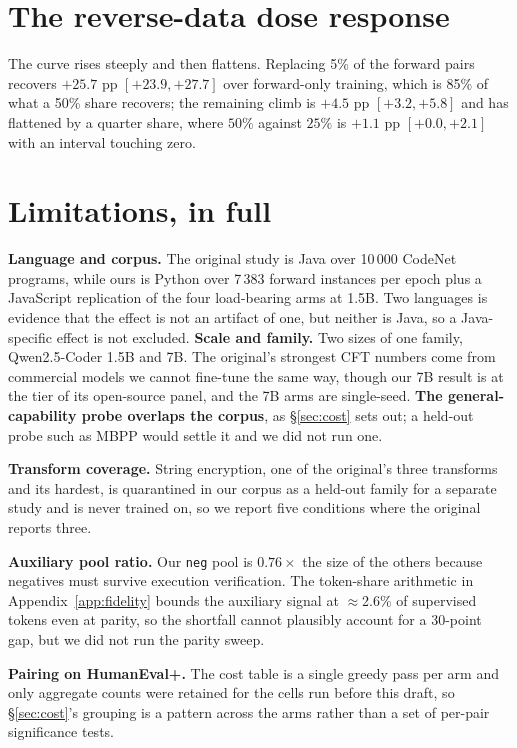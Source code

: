 \documentclass{article}
\newcommand{\arm}[1]{\texttt{#1}}
\begin{document}
\section{The reverse-data dose response}
\label{app:dose}

The curve rises steeply and then flattens. Replacing 5\% of the forward pairs recovers
$+25.7$ pp $[+23.9,+27.7]$ over forward-only training, which is 85\% of what a 50\% share
recovers; the remaining climb is $+4.5$ pp $[+3.2,+5.8]$ and has flattened by a quarter
share, where $50\%$ against $25\%$ is $+1.1$ pp $[+0.0,+2.1]$ with an interval touching zero.

\section{Limitations, in full}
\label{app:limits}

\textbf{Language and corpus.} The original study is Java over 10\,000 CodeNet programs,
while ours is Python over 7\,383 forward instances per epoch plus a JavaScript replication
of the four load-bearing arms at 1.5B. Two languages is evidence that the effect is not an
artifact of one, but neither is Java, so a Java-specific effect is not excluded.
\textbf{Scale and family.} Two sizes of one family, Qwen2.5-Coder 1.5B and 7B. The
original's strongest CFT numbers come from commercial models we cannot fine-tune the same
way, though our 7B result is at the tier of its open-source panel, and the 7B arms are
single-seed. 
\textbf{The general-capability probe overlaps the corpus}, as §\ref{sec:cost} sets out; a
held-out probe such as MBPP would settle it and we did not run one.


\textbf{Transform coverage.} String encryption, one of the original's three transforms and
its hardest, is quarantined in our corpus as a held-out family for a separate study and is
never trained on, so we report five conditions where the original reports three.

\textbf{Auxiliary pool ratio.} Our \arm{neg} pool is $0.76\times$ the size of the others
because negatives must survive execution verification. The token-share arithmetic in
Appendix~\ref{app:fidelity} bounds the auxiliary signal at $\approx$2.6\% of supervised
tokens even at parity, so the shortfall cannot plausibly account for a 30-point gap, but we
did not run the parity sweep.

\textbf{Pairing on HumanEval+.} The cost table is a single greedy pass per arm and only
aggregate counts were retained for the cells run before this draft, so §\ref{sec:cost}'s
grouping is a pattern across the arms rather than a set of per-pair significance tests.
\end{document}
